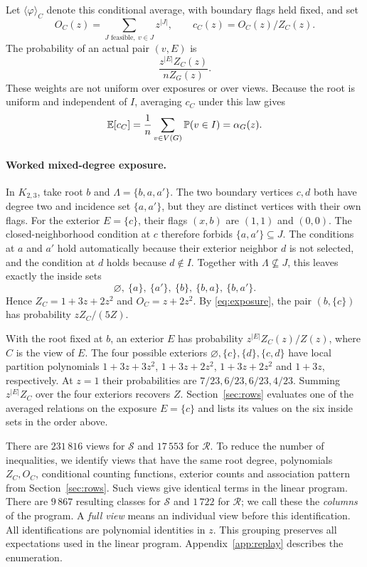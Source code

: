 \documentclass[11pt]{article}
\begin{document}
Let $\langle\varphi\rangle_C$ denote this conditional average, with boundary flags held fixed, and set
\[
 O_C(z)=\sum_{J\text{ feasible},\ v\in J}z^{|J|},\qquad c_C(z)=O_C(z)/Z_C(z).
\]
The probability of an actual pair $(v,E)$ is
\begin{equation}\label{eq:exposure}
 \frac{z^{|E|}Z_C(z)}{nZ_G(z)}.
\end{equation}
These weights are not uniform over exposures or over views. Because the root is uniform and independent of $I$, averaging $c_C$ under this law gives
\[
 \mathbb E[c_C]=\frac1n\sum_{v\in V(G)}\mathbb P(v\in I)=\alpha_G(z).
\]

\paragraph{Worked mixed-degree exposure.}\label{par:worked}
In $K_{2,3}$, take root $b$ and $\Lambda=\{b,a,a'\}$. The two boundary vertices $c,d$ both have degree two and incidence set $\{a,a'\}$, but they are distinct vertices with their own flags. For the exterior $E=\{c\}$, their flags $(x,b)$ are $(1,1)$ and $(0,0)$. The closed-neighborhood condition at $c$ therefore forbids $\{a,a'\}\subseteq J$. The conditions at $a$ and $a'$ hold automatically because their exterior neighbor $d$ is not selected, and the condition at $d$ holds because $d\notin I$. Together with $\Lambda\nsubseteq J$, this leaves exactly the inside sets
\[
 \varnothing,\ \{a\},\ \{a'\},\ \{b\},\ \{b,a\},\ \{b,a'\}.
\]
Hence $Z_C=1+3z+2z^2$ and $O_C=z+2z^2$. By \eqref{eq:exposure}, the pair $(b,\{c\})$ has probability $zZ_C/(5Z)$.

With the root fixed at $b$, an exterior $E$ has probability $z^{|E|}Z_C(z)/Z(z)$, where $C$ is the view of $E$. The four possible exteriors $\varnothing,\{c\},\{d\},\{c,d\}$ have local partition polynomials $1+3z+3z^2$, $1+3z+2z^2$, $1+3z+2z^2$ and $1+3z$, respectively. At $z=1$ their probabilities are $7/23,6/23,6/23,4/23$. Summing $z^{|E|}Z_C$ over the four exteriors recovers $Z$. Section~\ref{sec:rows} evaluates one of the averaged relations on the exposure $E=\{c\}$ and lists its values on the six inside sets in the order above.


There are $231\,816$ views for $\mathcal S$ and $17\,553$ for $\mathcal R$. To reduce the number of inequalities, we identify views that have the same root degree, polynomials $Z_C,O_C$, conditional counting functions, exterior counts and association pattern from Section~\ref{sec:rows}. Such views give identical terms in the linear program. There are $9\,867$ resulting classes for $\mathcal S$ and $1\,722$ for $\mathcal R$; we call these the \emph{columns} of the program. A \emph{full view} means an individual view before this identification. All identifications are polynomial identities in $z$. This grouping preserves all expectations used in the linear program. Appendix~\ref{app:replay} describes the enumeration.
\end{document}
